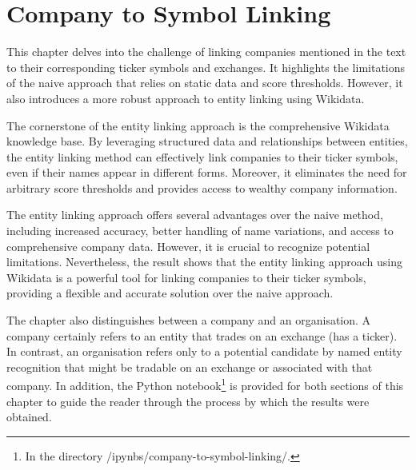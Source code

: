 \chapter{Company to Symbol Linking}
\label{chap:comapny-to-symbol-linking}
This chapter delves into the challenge of linking companies mentioned in the text to their corresponding ticker symbols and exchanges. It highlights the limitations of the naive approach that relies on static data and score thresholds. However, it also introduces a more robust approach to entity linking using Wikidata. 

The cornerstone of the entity linking approach is the comprehensive Wikidata knowledge base. By leveraging structured data and relationships between entities, the entity linking method can effectively link companies to their ticker symbols, even if their names appear in different forms. Moreover, it eliminates the need for arbitrary score thresholds and provides access to wealthy company information.

The entity linking approach offers several advantages over the naive method, including increased accuracy, better handling of name variations, and access to comprehensive company data. However, it is crucial to recognize potential limitations. Nevertheless, the result shows that the entity linking approach using Wikidata is a powerful tool for linking companies to their ticker symbols, providing a flexible and accurate solution over the naive approach.

The chapter also distinguishes between a company and an organisation. A company certainly refers to an entity that trades on an exchange (has a ticker). In contrast, an organisation refers only to a potential candidate by named entity recognition that might be tradable on an exchange or associated with that company. In addition, the Python notebook\footnote{In the directory /ipynbs/company-to-symbol-linking/.} is provided for both sections of this chapter to guide the reader through the process by which the results were obtained.


